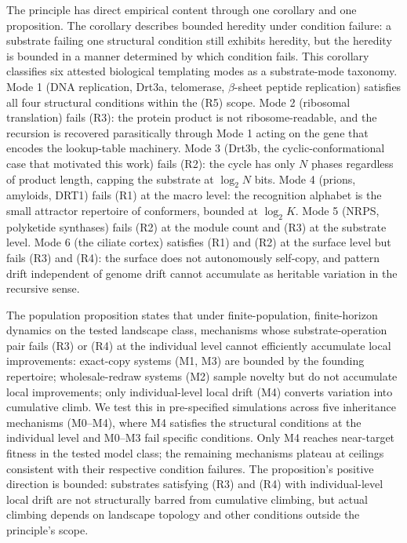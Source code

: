 \documentclass[aps,prx,reprint,amsmath,amssymb,floatfix,superscriptaddress,nofootinbib]{revtex4-2}
\theoremstyle{plain-thm}
\theoremstyle{definition-thm}
\begin{document}
The principle has direct empirical content through one corollary and one proposition. The corollary describes bounded heredity under condition failure: a substrate failing one structural condition still exhibits heredity, but the heredity is bounded in a manner determined by which condition fails. This corollary classifies six attested biological templating modes as a substrate-mode taxonomy. Mode 1 (DNA replication, Drt3a, telomerase, $\beta$-sheet peptide replication) satisfies all four structural conditions within the (R5) scope. Mode 2 (ribosomal translation) fails (R3): the protein product is not ribosome-readable, and the recursion is recovered parasitically through Mode 1 acting on the gene that encodes the lookup-table machinery. Mode 3 (Drt3b, the cyclic-conformational case that motivated this work) fails (R2): the cycle has only $N$ phases regardless of product length, capping the substrate at $\log_2 N$ bits. Mode 4 (prions, amyloids, DRT1) fails (R1) at the macro level: the recognition alphabet is the small attractor repertoire of conformers, bounded at $\log_2 K$. Mode 5 (NRPS, polyketide synthases) fails (R2) at the module count and (R3) at the substrate level. Mode 6 (the ciliate cortex) satisfies (R1) and (R2) at the surface level but fails (R3) and (R4): the surface does not autonomously self-copy, and pattern drift independent of genome drift cannot accumulate as heritable variation in the recursive sense.

The population proposition states that under finite-population, finite-horizon dynamics on the tested landscape class, mechanisms whose substrate-operation pair fails (R3) or (R4) at the individual level cannot efficiently accumulate local improvements: exact-copy systems (M1, M3) are bounded by the founding repertoire; wholesale-redraw systems (M2) sample novelty but do not accumulate local improvements; only individual-level local drift (M4) converts variation into cumulative climb. We test this in pre-specified simulations across five inheritance mechanisms (M0--M4), where M4 satisfies the structural conditions at the individual level and M0--M3 fail specific conditions. Only M4 reaches near-target fitness in the tested model class; the remaining mechanisms plateau at ceilings consistent with their respective condition failures. The proposition's positive direction is bounded: substrates satisfying (R3) and (R4) with individual-level local drift are not structurally barred from cumulative climbing, but actual climbing depends on landscape topology and other conditions outside the principle's scope.
\end{document}
